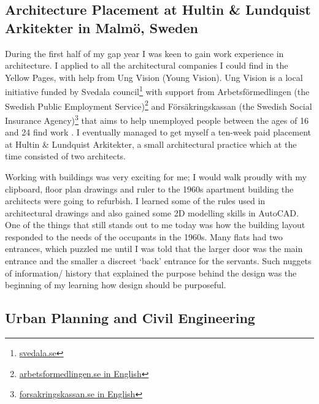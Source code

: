 
\subsection{Architecture Placement at Hultin \& Lundquist Arkitekter in Malmö, Sweden}

During the first half of my gap year I was keen to gain work experience in architecture. I applied to all the architectural companies I could find in the Yellow Pages, with help from Ung Vision (Young Vision).
Ung Vision is a local initiative funded by Svedala council\footnote{\href{https://www.svedala.se/}{svedala.se}} with support from Arbetsförmedlingen (the Swedish Public Employment Service)\footnote{\href{https://www.arbetsformedlingen.se/Globalmeny/Other-languages/Languages/English-engelska.html}{arbetsformedlingen.se in English}} and Försäkringskassan (the Swedish Social Insurance Agency)\footnote{\href{https://www.forsakringskassan.se/privatpers/!ut/p/z1/04_Sj9CPykssy0xPLMnMz0vMAfIjo8ziTTxcnA3dnQ28LdyNTQ0cAwMMjU38jby8gg30w_Wj9KOASgxwAEcD_YLsbEUAFUIRCA!!/dz/d5/L0lDUmlTUSEhL3dHa0FKRnNBLzROV3FpQSEhL2Vu/?keepNavState=true}{forsakringskassan.se in English}} that aims to help unemployed people between the ages of 16 and 24 find work \citep{ungvision:online}.
I eventually managed to get myself a ten-week paid placement at Hultin \& Lundquist Arkitekter, a small architectural practice which at the time consisted of two architects.

Working with buildings was very exciting for me; I would walk proudly with my clipboard, floor plan drawings and ruler to the 1960s apartment building the architects were going to refurbish.
I learned some of the rules used in architectural drawings and also gained some 2D modelling skills in  AutoCAD.
One of the things that still stands out to me today was how the building layout responded to the needs of the occupants in the 1960s.
Many flats had two entrances, which puzzled me until I was told that the larger door was the main entrance and the smaller a discreet `back' entrance for the servants.
Such nuggets of information/ history that explained the purpose behind the design was the beginning of my learning how design should be purposeful.



\subsection{Urban Planning and Civil Engineering}

